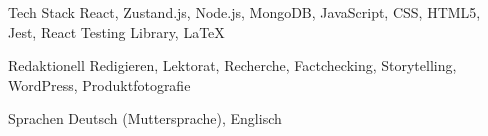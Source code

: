 

\begin{cvskills}

  \cvskill
    {Tech Stack} %
    {React, Zustand.js, Node.js, MongoDB, JavaScript, CSS, HTML5, Jest, React Testing Library, LaTeX} %

  \cvskill
    {Redaktionell} %
    {Redigieren, Lektorat, Recherche, Factchecking, Storytelling, WordPress, Produktfotografie} %

  \cvskill
    {Sprachen} %
    {Deutsch (Muttersprache), Englisch} %

\end{cvskills}

